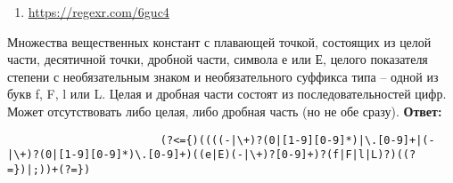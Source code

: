 \documentclass[]{article}
\begin{document}
\begin{enumerate}
\begin{item}
\begin{enumerate}
\begin{item}
\begin{enumerate}
                \begin{item}
                    \begin{itemize}
                        \item \lstinline|{Imposter420} $\Rightarrow$ Imposter420|
                        \item \lstinline|{_420ImPoster} $\Rightarrow$ _420ImPoster|
                        \item \lstinline|{__imposter} $\Rightarrow$ $\varepsilon$|
                        \item \lstinline|{420ImPoster} $\Rightarrow$ $\varepsilon$|
                        \item \lstinline|{Imp@ster} $\Rightarrow$ $\varepsilon$|
                        \item \lstinline|{Imposter420;_420ImPoster;coolGuy} $\Rightarrow$ Imposter420;_420ImPoster;coolGuy|
                        \item \lstinline|{_420ImPoster;__imp@sSt3r} $\Rightarrow$ $\varepsilon$|
                        \item \lstinline|{_} $\Rightarrow$ $\varepsilon$|
                        \item \lstinline|Imposter420 $\Rightarrow$ $\varepsilon$|
                    \end{itemize}
                \end{item}

                \item \url{https://regexr.com/6guc4}

            \end{enumerate}
        \end{item}

        \begin{item}
            Множества вещественных констант с плавающей точкой, состоящих из целой части, десятичной точки, дробной части, символа е или Е, целого показателя степени с необязательным знаком и необязательного суффикса типа – одной из букв f, F, l или L. Целая и дробная части состоят из последовательностей цифр. Может отсутствовать либо целая, либо дробная часть (но не обе сразу).
            \bigbreak
            \textbf{Ответ:}
            \begin{enumerate}

                \begin{item}
                    \begin{lstlisting}
                        (?<={)((((-|\+)?(0|[1-9][0-9]*)|\.[0-9]+|(-|\+)?(0|[1-9][0-9]*)\.[0-9]+)((e|E)(-|\+)?[0-9]+)?(f|F|l|L)?)((?=})|;))+(?=})
                    \end{lstlisting}
                \end{item}


\end{enumerate}
\end{item}
\end{enumerate}
\end{item}
\end{enumerate}
\end{document}
